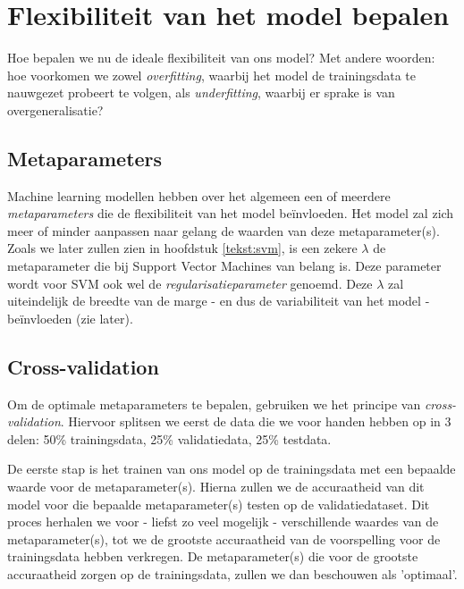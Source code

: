 \documentclass[TeamE-eindrapport]{subfiles}
\begin{document}
	\section{Flexibiliteit van het model bepalen}
	
	Hoe bepalen we nu de ideale flexibiliteit van ons model? Met andere woorden: hoe voorkomen we zowel \textit{overfitting}, waarbij het model de trainingsdata te nauwgezet probeert te volgen, als \textit{underfitting}, waarbij er sprake is van overgeneralisatie?
	
	\label{tekst:validatie}
	
	\subsection{Metaparameters}
	
	\label{tekst:metaparameter}
	
	Machine learning modellen hebben over het algemeen een of meerdere \textit{metaparameters} die de flexibiliteit van het model beïnvloeden. Het model zal zich meer of minder aanpassen naar gelang de waarden van deze metaparameter(s). Zoals we later zullen zien in hoofdstuk \ref{tekst:svm}, is een zekere \(\lambda\) de metaparameter die bij Support Vector Machines van belang is. Deze parameter wordt voor SVM ook wel de \textit{regularisatieparameter} genoemd. Deze \(\lambda\) zal uiteindelijk de breedte van de marge - en dus de variabiliteit van het model - beïnvloeden (zie later). 
	
	\subsection{Cross-validation}
	
	\label{tekst:crossvalidation}

	Om de optimale metaparameters te bepalen, gebruiken we het principe van \textit{cross-validation}. Hiervoor splitsen we eerst de data die we voor handen hebben op in 3 delen: 50\% trainingsdata, 25\% validatiedata, 25\% testdata. 
	
	De eerste stap is het trainen van ons model op de trainingsdata met een bepaalde waarde voor de metaparameter(s). Hierna zullen we de accuraatheid van dit model voor die bepaalde metaparameter(s) testen op de validatiedataset. Dit proces herhalen we voor - liefst zo veel mogelijk - verschillende waardes van de metaparameter(s), tot we de grootste accuraatheid van de voorspelling voor de trainingsdata hebben verkregen. De metaparameter(s) die voor de grootste accuraatheid zorgen op de trainingsdata, zullen we dan beschouwen als 'optimaal'. 
	
\end{document}
